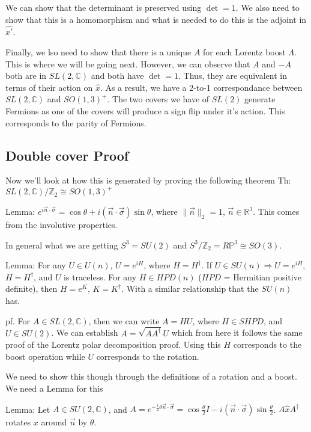 We can show that the determinant is preserved using $\det = 1$. We also
need to show that this is a homomorphism and what is needed to
do this is the adjoint in $\hat{x'}$.

Finally, we lso need to show that there is a unique $A$ for each Lorentz boost $\Lambda$.
This is where we will be going next. However, we can observe that $A$ and $-A$ both
are in $SL(2, \mathbb{C})$ and both have $\det = 1$. Thus, they are equivalent in terms
of their action on $\hat{x}$. As a result, we have a 2-to-1 correspondance between
$SL(2, \mathbb{C})$ and $SO(1, 3)^+$. The two covers we have of $SL(2)$ generate
Fermions as one of the covers will produce a sign flip under it's action. This corresponds
to the parity of Fermions.

\subsection{Double cover Proof}
Now we'll look at how this is generated by proving the following theorem
Th: $SL(2, \mathbb{C}) / \mathbb{Z}_2 \cong SO(1, 3)^+$

Lemma: 
$e^{i \vec{n}\cdot\vec{\sigma}} = 
\cos \theta + i \left(\vec{n}\cdot\vec{\sigma}\right) \sin \theta$, 
where $\lVert\vec{n}\rVert_2 = 1$,
$\vec{n} \in \mathbb{R}^3$. This comes from the involutive properties.

In general what we are getting $S^3 = SU(2)$ and 
$S^3 / \mathbb{Z}_2 = R \mathbb{P}^3 \cong SO(3)$.

Lemma:
For any $U \in U(n)$, $U = e^{i H}$, where $H = H^\dagger$.
If $U \in SU(n) \Rightarrow U = e^{i H}$, $H = H^\dagger$, and $U$ is traceless.
For any $H \in HPD(n)$ ($HPD$ = Hermitian positive definite), then
$H = e^K$, $K = K^\dagger$. With a similar relationship that the $SU(n)$ has.

pf.
For $A \in SL(2, \mathbb{C})$, then we can write $A = H U$, where
$H \in SHPD$, and $U \in SU(2)$. We can establish
$A = \sqrt{A A^\dagger} U$ which from here it follows the same proof
of the Lorentz polar decomposition proof. Using this $H$ corresponds to the
boost operation while $U$ corresponds to the rotation.

We need to show this though through the definitions of a rotation and a boost.
We need a Lemma for this

Lemma: Let $A \in SU(2, \mathbb{C})$, and 
$A = e^{-\frac{i}{2} \theta \vec{n} \cdot \vec{\sigma}} =
\cos \frac{\theta}{2} I - i \left(\vec{n}\cdot\vec{\sigma}\right) \sin \frac{\theta}{2}$.
$A \hat{x} A^\dagger$ rotates $x$ around $\vec{n}$ by $\theta$.

